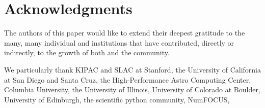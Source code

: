 \section{Acknowledgments}

The authors of this paper would like to extend their deepest gratitude to the
many, many individual and institutions that have contributed, directly or
indirectly, to the growth of both \yt{} and the \yt{} community.


We
particularly thank KIPAC and SLAC at Stanford, the University of California at
San Diego and Santa Cruz, the High-Performance Astro Computing Center, Columbia
University, the University of Illinois, University of Colorado at Boulder,
University of Edinburgh, the scientific python community, NumFOCUS, 

